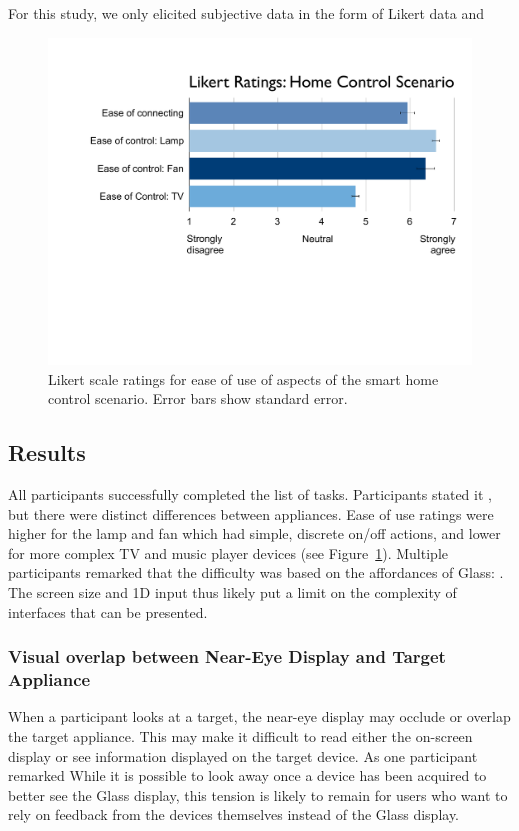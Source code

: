 For this study, we only elicited subjective data in the form of Likert data and 
\begin{figure}[b]
\centering
\includegraphics[width=1.0\columnwidth]{figures/scenario-likert.pdf}
\caption{Likert scale ratings for ease of use of aspects of the smart home control scenario. Error bars show standard error.}
\label{fig:smarthome-likert}
\end{figure}

\subsection{Results}
All participants successfully completed the list of tasks.
Participants stated it , but there were distinct differences between appliances. Ease of use ratings were higher for the lamp and fan which had simple, discrete on/off actions, and lower for more complex TV and music player devices (see Figure~\ref{fig:smarthome-likert}). Multiple participants remarked that the difficulty was based on the affordances of Glass: . The screen size and 1D input thus likely put a limit on the complexity of interfaces that can be presented.


\subsubsection{Visual overlap between Near-Eye Display and Target Appliance}
When a participant looks at a target, the near-eye display may occlude or overlap the target appliance. This may make it difficult to read either the on-screen display or see information displayed on the target device.  As one participant remarked  While it is possible to look away once a device has been acquired to better see the Glass display, this tension is likely to remain for users who want to rely on feedback from the devices themselves instead of the Glass display.

